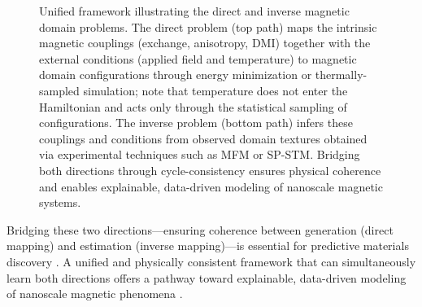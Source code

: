 \documentclass[letterpaper, 12, one column]{article}
\begin{document}
\begin{figure}[H]
\centering
{}
    \caption{Unified framework illustrating the direct and inverse magnetic domain problems. The direct problem (top path) maps the intrinsic magnetic couplings (exchange, anisotropy, DMI) together with the external conditions (applied field and temperature) to magnetic domain configurations through energy minimization or thermally-sampled simulation; note that temperature does not enter the Hamiltonian and acts only through the statistical sampling of configurations. The inverse problem (bottom path) infers these couplings and conditions from observed domain textures obtained via experimental techniques such as MFM or SP-STM. Bridging both directions through cycle-consistency ensures physical coherence and enables explainable, data-driven modeling of nanoscale magnetic systems.}
    \label{fig:framework}
\end{figure}

Bridging these two directions—ensuring coherence between generation (direct mapping) and estimation (inverse mapping)—is essential for predictive materials discovery \cite{Feng2024}. A unified and physically consistent framework that can simultaneously learn both directions offers a pathway toward explainable, data-driven modeling of nanoscale magnetic phenomena \cite{Kovacs2023PhysicsInformed}.
\end{document}
